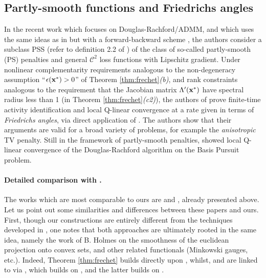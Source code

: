 \subsection{{Partly-smooth functions and Friedrichs angles}} In the
recent work \citep{liang2014activity} which focuses on
Douglas-Rachford/ADMM, and \citep{liang2015activity} which
uses the same ideas as in \citep{liang2014activity} but with a
forward-backward scheme \citep{combettes2005signal},
the authors consider a subclass PSS (refer to definition 2.2 of
  \citep{liang2015activity}) of the class of so-called partly-smooth
  (PS) penalties
and general $\mathcal{C}^2$ loss functions with Lipschitz
gradient. Under nonlinear complementarity requirements analogous to
the non-degeneracy assumption ``$\epsilon(\mathbf{x}^*) > 0$'' of Theorem
\ref{thm:frechet}\textit{(b)}, and rank constraints analogous to the
requirement that the Jacobian matrix $\Lambda'(\mathbf{x}^*)$
have spectral radius less than 1 (in Theorem
\ref{thm:frechet}\textit{(c2)}), the authors of
\citep{liang2014activity,liang2015activity} prove finite-time activity
identification and local Q-linear convergence at a rate given in terms of
\textit{Friedrichs angles}, via direct application of \cite[Theorem
3.10]{bauschke2014optimal}.
The authors show that their
arguments are valid for a broad variety of problems, for example the
\textit{anisotropic} TV penalty. %
Still in the
framework of partly-smooth penalties, \citep{demanet2013eveventual}
showed local Q-linear convergence of the Douglas-Rachford algorithm on
the Basis Pursuit problem.

\paragraph*{Detailed comparison with
  \citep{liang2014activity,liang2015activity}.} The
works which are most comparable to ours are \citep{liang2014activity}
and \citep{liang2015activity}, already presented above. Let us point
out some similarities and differences between these papers and
ours. First, though our constructions are entirely different from the
techniques developed in
\citep{liang2014activity,liang2015activity}, one notes that both
approaches are ultimately rooted in
the same idea, namely
the work of B. Holmes \citep{holmes1973} on the smoothness of the euclidean
projection onto convex sets, and other related functionals (Minkowski
gauges, etc.). Indeed, Theorem \ref{thm:frechet} builds
directly upon \citep{holmes1973}, whilst, \citep{liang2015activity} and
\citep{liang2014activity} are linked to \citep{holmes1973} via
\citep{wright93}, which builds on \citep{phelps82}, and the latter builds
on \citep{holmes1973}.

